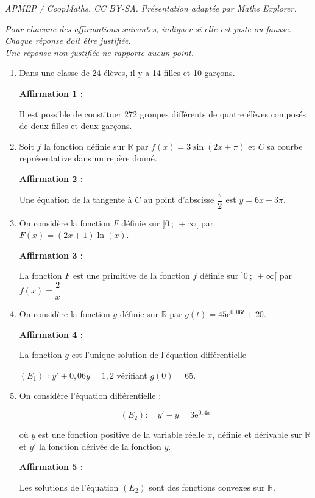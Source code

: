 \documentclass[10pt]{article}
\providecommand{\R}{\mathbb{R}}
\providecommand{\e}{{\mathrm{e}}}
\begin{document}
\noindent\textit{APMEP / CoopMaths. CC BY-SA. Présentation adaptée par Maths Explorer.}\par\medskip
\medskip

\emph{Pour chacune des affirmations suivantes, indiquer si elle est juste ou fausse.\\ Chaque réponse doit être justifiée.\\ Une réponse non justifiée ne rapporte aucun point.}

\medskip

\begin{enumerate}
\item Dans une classe de 24 élèves, il y a 14 filles et 10 garçons.

\textbf{Affirmation 1 :}

Il est possible de constituer 272 groupes différents de quatre élèves composés de deux filles et deux garçons.
\item Soit $f$ la fonction définie sur $\R$ par $f(x) = 3\sin(2x + \pi)$ et $C$ sa courbe représentative dans un repère donné.

\textbf{Affirmation 2 :}

Une équation de la tangente à $C$ au point d’abscisse $\dfrac{\pi}{2}$ est $y = 6x - 3\pi$.

\item On considère la fonction $F$ définie sur $]0~;~+\infty[$ par $F(x) = (2x + 1)\ln (x)$.

\textbf{Affirmation 3 :}

La fonction $F$ est une primitive de la fonction $f$ définie sur $]0~;~+\infty[$ par $f(x) = \dfrac2x$.
\item On considère la fonction $g$ définie sur $\R$ par $g(t) = 45\e^{0,06t} + 20$.

\textbf{Affirmation 4 :}

La fonction $g$ est l’unique solution de l'équation différentielle

$(E_1)\: ∶ y' + 0,06y = 1,2$ vérifiant $g(0) = 65$.

\item On considère l’équation différentielle :

\[(E_2) :\quad y' - y = 3\e^{0,4x}\]

où $y$ est une fonction positive de la variable réelle $x$, définie et dérivable sur $\R$ et $y'$ la fonction dérivée de la fonction $y$.

\textbf{Affirmation 5 :}

Les solutions de l’équation $(E_2)$ sont des fonctions convexes sur $\R$.
\end{enumerate}

\medskip
\end{document}

